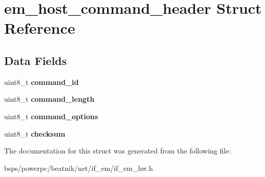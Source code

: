 \hypertarget{structem__host__command__header}{}\section{em\+\_\+host\+\_\+command\+\_\+header Struct Reference}
\label{structem__host__command__header}
\subsection*{Data Fields}
\begin{DoxyCompactItemize}
\item 
\mbox{\label{structem__host__command__header_ad496d7eba18935094309ba24afada79d}} 
uint8\+\_\+t {\bfseries command\+\_\+id}
\item 
\mbox{\label{structem__host__command__header_a9a5fe54b296186270616e1a929238958}} 
uint8\+\_\+t {\bfseries command\+\_\+length}
\item 
\mbox{\label{structem__host__command__header_afad49956b85256e1817c7e1efba4b969}} 
uint8\+\_\+t {\bfseries command\+\_\+options}
\item 
\mbox{\label{structem__host__command__header_acaa3e06e0e2c34055b76de94dfd26774}} 
uint8\+\_\+t {\bfseries checksum}
\end{DoxyCompactItemize}


The documentation for this struct was generated from the following file\+:\begin{DoxyCompactItemize}
\item 
bsps/powerpc/beatnik/net/if\+\_\+em/if\+\_\+em\+\_\+hw.\+h\end{DoxyCompactItemize}
